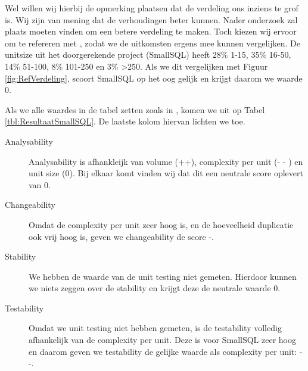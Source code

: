 \documentclass[a4paper]{article}
\begin{document}
Wel willen wij hierbij de opmerking plaatsen dat de verdeling ons inziens te grof is. Wij zijn van mening dat de verhoudingen beter kunnen. Nader onderzoek zal plaats moeten vinden om een betere verdeling te maken. Toch kiezen wij ervoor om te refereren met \cite{B}, zodat we de uitkomsten ergens mee kunnen vergelijken. De unitsize uit het doorgerekende project (SmallSQL) heeft 28\% 1-15, 35\% 16-50, 14\% 51-100, 8\% 101-250 en 3\% \textgreater{}250.
Als we dit vergelijken met Figuur \ref{fig:RefVerdeling}, scoort SmallSQL op het oog gelijk en krijgt daarom we waarde 0.


Als we alle waardes in de tabel zetten zoals in \cite{A}, komen we uit op Tabel \ref{tbl:ResultaatSmallSQL}. De laatste kolom hiervan lichten we toe.
\begin{description}
\item[Analysability] Analysability is afhankleijk van volume (++), complexity per unit (- - ) en unit size (0). Bij elkaar komt vinden wij dat dit een neutrale score oplevert van 0.
\item[Changeability] Omdat de complexity per unit zeer hoog is, en de hoeveelheid duplicatie ook vrij hoog is, geven we changeability de score -.
\item[Stability] We hebben de waarde van de unit testing niet gemeten. Hierdoor kunnen we niets zeggen over de stability en krijgt deze de neutrale waarde 0.
\item[Testability] Omdat we unit testing niet hebben gemeten, is de testability volledig afhankelijk van de complexity per unit. Deze is voor SmallSQL zeer hoog en daarom geven we testability de gelijke waarde als complexity per unit: - -.
\end{description}
\end{document}
